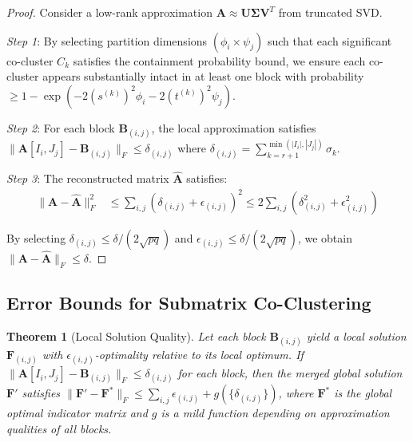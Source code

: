 \documentclass[journal]{IEEEtran}
\newtheorem{theorem}{Theorem}
\begin{document}
\begin{proof}
    {\color{blue}Consider a low-rank approximation $\mathbf{A} \approx \mathbf{U}\mathbf{\Sigma}\mathbf{V}^T$ from truncated SVD.

        \textit{Step 1}: By selecting partition dimensions $(\phi_i \times \psi_j)$ such that each significant co-cluster $C_k$ satisfies the containment probability bound, we ensure each co-cluster appears substantially intact in at least one block with probability $\geq 1 - \exp(-2(s^{(k)})^2\phi_i - 2(t^{(k)})^2\psi_j)$.

        \textit{Step 2}: For each block $\mathbf{B}_{(i,j)}$, the local approximation satisfies $\|\mathbf{A}[I_i, J_j] - \mathbf{B}_{(i,j)}\|_F \leq \delta_{(i,j)}$ where $\delta_{(i,j)} = \sum_{k=r+1}^{\min(|I_i|,|J_j|)} \sigma_k$.

        \textit{Step 3}: The reconstructed matrix $\hat{\mathbf{A}}$ satisfies:
        \begin{align}
            \|\mathbf{A} - \hat{\mathbf{A}}\|_F^2 & \leq \sum_{i,j} (\delta_{(i,j)} + \epsilon_{(i,j)})^2 \leq 2\sum_{i,j} (\delta_{(i,j)}^2 + \epsilon_{(i,j)}^2)
        \end{align}

        By selecting $\delta_{(i,j)} \leq \delta/(2\sqrt{pq})$ and $\epsilon_{(i,j)} \leq \delta/(2\sqrt{pq})$, we obtain $\|\mathbf{A} - \hat{\mathbf{A}}\|_F \leq \delta$.}
\end{proof}

\subsection{Error Bounds for Submatrix Co-Clustering}
\begin{theorem}[Local Solution Quality]
    \label{thm:local-solution-quality}
    Let each block $\mathbf{B}_{(i,j)}$ yield a local solution $\mathbf{F}_{(i,j)}$ with $\epsilon_{(i,j)}$-optimality relative to its local optimum. If $\|\mathbf{A}[I_i,J_j] - \mathbf{B}_{(i,j)}\|_F \le \delta_{(i,j)}$ for each block, then the merged global solution $\mathbf{F}'$ satisfies $\|\mathbf{F}' - \mathbf{F}^*\|_F \le \sum_{i,j} \epsilon_{(i,j)} + g(\{\delta_{(i,j)}\})$, where $\mathbf{F}^*$ is the global optimal indicator matrix and $g$ is a mild function depending on approximation qualities of all blocks.
\end{theorem}
\end{document}
